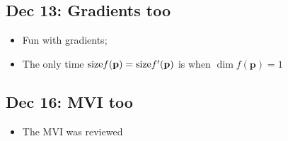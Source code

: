 \documentclass[10pt, oneside]{article}
\renewcommand{\vec}[1]{\mathbf{#1}}
\begin{document}
\subsection{Dec 13: Gradients too}
\begin{itemize}
    \item Fun with gradients;
    \item The only time ${\rm size } f(\vec{p}) = {\rm size } f'(\vec{p})$ is when $\dim f(\vec{p}) = 1$
\end{itemize}

\subsection{Dec 16: MVI too}
\begin{itemize}
    \item The MVI was reviewed
\end{itemize}
\end{document}
